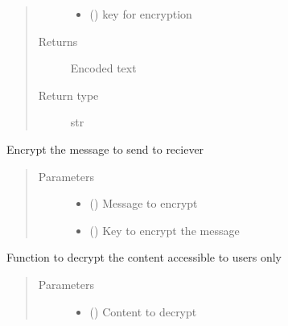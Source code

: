\documentclass[letterpaper,10pt,english]{sphinxmanual}
\begin{document}
\begin{fulllineitems}
\begin{fulllineitems}
\begin{quote}
\begin{description}
\begin{itemize}
\item {} 
 () \textendash{} key for encryption

\end{itemize}

\item[{Returns}] \leavevmode
Encoded text

\item[{Return type}] \leavevmode
str

\end{description}\end{quote}

\end{fulllineitems}


\begin{fulllineitems}
\label{\detokenize{Message:Message.Message._encrypt}}
Encrypt the message to send to reciever
\begin{quote}\begin{description}
\item[{Parameters}] \leavevmode\begin{itemize}
\item {} 
 () \textendash{} Message to encrypt

\item {} 
 () \textendash{} Key to encrypt the message

\end{itemize}

\end{description}\end{quote}

\end{fulllineitems}


\begin{fulllineitems}
\label{\detokenize{Message:Message.Message._decrypt}}
Function to decrypt the content accessible to users only
\begin{quote}\begin{description}
\item[{Parameters}] \leavevmode\begin{itemize}
\item {} 
 () \textendash{} Content to decrypt


\end{itemize}
\end{description}
\end{quote}
\end{fulllineitems}
\end{fulllineitems}
\end{document}

